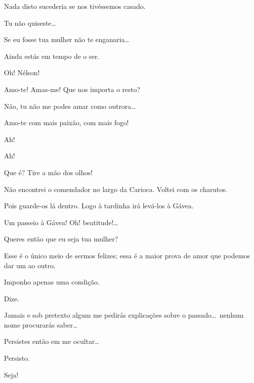 {  
Nada disto sucederia se nos tivéssemos casado.

  Tu não quiseste\ldots

  Se eu fosse tua mulher não te enganaria\ldots

  Ainda estás em tempo de o ser.

  Oh! Nélson!

  Amo{}-te! Amas{}-me! Que nos importa o resto?

  Não, tu não me podes amar como outrora\ldots

  Amo{}-te com mais paixão, com mais fogo!


  Ah!

  Ah!

  Que é? Tire
a mão dos olhos!

  Não encontrei o comendador no largo da Carioca. Voltei
com os charutos.

  Pois guarde{}-os lá dentro. Logo à tardinha irá
levá{}-los à Gávea.

   Um passeio à Gávea! Oh! beatitude!\ldots\ 

  Queres então que eu seja tua mulher?

  Esse é o único meio de sermos felizes; essa é
a maior prova de amor que podemos dar um ao outro.

  Imponho apenas uma condição.

  Dize.

  Jamais e sob pretexto algum me pedirás
explicações sobre o passado\ldots\ nenhum nome procurarás saber\ldots

  Persistes então em me ocultar\ldots

  Persisto.

  Seja!


}

